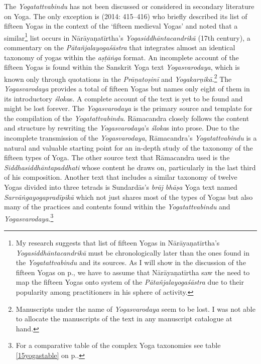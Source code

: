 The \textit{Yogatattvabindu} has not been discussed or considered in secondary literature on Yoga. The only exception is \citeauthor{birch2014} (2014: 415–416) who briefly described its list of fifteen Yogas in the context of the `fifteen medieval Yogas' and noted that a similar\footnote{My research suggests that list of fifteen Yogas in Nārāyaṇatīrtha’s \textit{Yogasiddhāntacandrikā} must be chronologically later than the ones found in the \textit{Yogatattvabindu} and its sources. As I will show in the discussion of the fifteen Yogas on p.\pageref{15yogas}, we have to assume that Nārāyaṇatīrtha saw the need to map the fifteen Yogas onto system of the \textit{Pātañjalayogaśāstra} due to their popularity among practitioners in his sphere of activity.} list occurs in Nārāyaṇatīrtha’s \textit{Yogasiddhāntacandrikā} (17th century), a commentary on the \textit{Pātañjalayogaśāstra} that integrates almost an identical taxonomy of yogas within the \textit{aṣṭāṅga} format. An incomplete account of the fifteen Yogas is found within the Sanskrit Yoga text \textit{Yogasvarodaya}, which is known only through quotations in the \textit{Prāṇatoṣinī} and \textit{Yogakarṇikā}.\footnote{Manuscripts under the name of \textit{Yogasvarodaya} seem to be lost. I was not able to allocate the manuscripts of the text in any manuscript catalogue at hand.} The \textit{Yogasvarodaya} provides a total of fifteen Yogas but names only eight of them in its introductory \textit{śloka}s. A complete account of the text is yet to be found and might be lost forever. The \textit{Yogasvarodaya} is the primary source and template for the compilation of the \textit{Yogatattvabindu}. Rāmacandra closely follows the content and structure by rewriting the \textit{Yogasvarodaya}’s \textit{śloka}s into prose. Due to the incomplete transmission of the \textit{Yogasvarodaya}, Rāmacandra’s \textit{Yogatattvabindu} is a natural and valuable starting point for an in-depth study of the taxonomy of the fifteen types of Yoga. The other source text that Rāmacandra used is the \textit{Siddhasiddhāntapaddhati} whose content he draws on, particularly in the last third of his composition. Another text that includes a similar taxonomy of twelve Yogas divided into three tetrads is Sundardās’s \textit{brāj bhāṣa} Yoga text named \textit{Sarvāṅgayogapradīpikā} which not just shares most of the types of Yogas but also many of the practices and contents found within the \textit{Yogatattvabindu} and \textit{Yogasvarodaya}.\footnote{For a comparative table of the complex Yoga taxonomies see table \ref{15yogastable} on p.\pageref{15yogastable}.}

